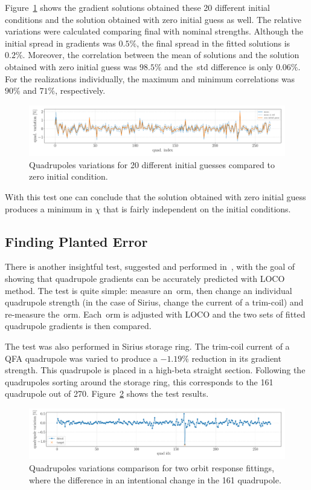 Figure~\ref{fig:quad_stren_ini_guess} shows the gradient solutions obtained these 20 different initial conditions and the solution obtained with zero initial guess as well. The relative variations were calculated comparing final with nominal strengths. Although the initial spread in gradients was $0.5\%$, the final spread in the fitted solutions is $0.2\%$. Moreover, the correlation between the mean of solutions and the solution obtained with zero initial guess was $98.5\%$ and the~\gls{std} difference is only $0.06\%$. For the realizations individually, the maximum and minimum correlations was $90\%$ and $71\%$, respectively.
\begin{figure}
\centering
\includegraphics[width=1.0\textwidth]{figures/quad_stren_initial_guess.pdf}
\caption{Quadrupoles variations for 20 different initial guesses compared to zero initial condition.}
\label{fig:quad_stren_ini_guess}
\end{figure}

With this test one can conclude that the solution obtained with zero initial guess produces a minimum in $\chi$ that is fairly independent on the initial conditions.
\subsection{Finding Planted Error}
There is another insightful test, suggested and performed in~\cite{safranek1995}, with the goal of showing that quadrupole gradients can be accurately predicted with LOCO method. The test is quite simple: measure an~\gls{orm}, then change an individual quadrupole strength (in the case of Sirius, change the current of a trim-coil) and re-measure the~\gls{orm}. Each~\gls{orm} is adjusted with LOCO and the two sets of fitted quadrupole gradients is then compared.

The test was also performed in Sirius storage ring. The trim-coil current of a QFA quadrupole was varied to produce a $-1.19\%$ reduction in its gradient strength. This quadrupole is placed in a high-beta straight section. Following the quadrupoles sorting around the storage ring, this corresponds to the 161 quadrupole out of 270. Figure~\ref{fig:delta_13M1_qfa} shows the test results.
\begin{figure}[h!]
\centering
\includegraphics[width=1.0\textwidth]{figures/delta_13M1_QFA.pdf}
\caption{Quadrupoles variations comparison for two orbit response fittings, where the difference in an intentional change in the 161 quadrupole.}
\label{fig:delta_13M1_qfa}
\end{figure}

